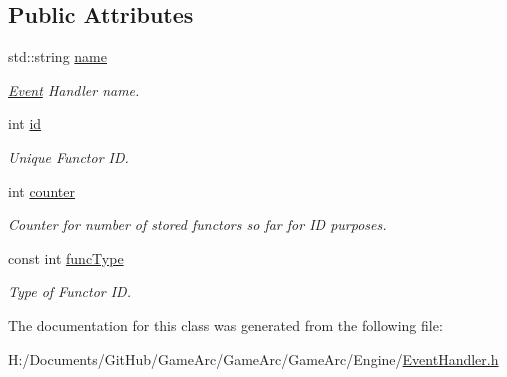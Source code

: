 \subsection*{Public Attributes}
\begin{DoxyCompactItemize}
\item 
\hypertarget{class_event_handler_aa5fd950e79ff5faedf4f728c321f6a8f}{std\+::string \hyperlink{class_event_handler_aa5fd950e79ff5faedf4f728c321f6a8f}{name}}\label{class_event_handler_aa5fd950e79ff5faedf4f728c321f6a8f}

\begin{DoxyCompactList}\small\item\em \hyperlink{class_event}{Event} Handler name. \end{DoxyCompactList}\item 
\hypertarget{class_event_handler_a42e721397724e29344fb56eeed8923b5}{int \hyperlink{class_event_handler_a42e721397724e29344fb56eeed8923b5}{id}}\label{class_event_handler_a42e721397724e29344fb56eeed8923b5}

\begin{DoxyCompactList}\small\item\em Unique Functor I\+D. \end{DoxyCompactList}\item 
\hypertarget{class_event_handler_a718ef39196fb47f8f0d66538b9fa31d7}{int \hyperlink{class_event_handler_a718ef39196fb47f8f0d66538b9fa31d7}{counter}}\label{class_event_handler_a718ef39196fb47f8f0d66538b9fa31d7}

\begin{DoxyCompactList}\small\item\em Counter for number of stored functors so far for I\+D purposes. \end{DoxyCompactList}\item 
\hypertarget{class_event_handler_af42c2a85560ab2f1f9c83f25c2c15fca}{const int \hyperlink{class_event_handler_af42c2a85560ab2f1f9c83f25c2c15fca}{func\+Type}}\label{class_event_handler_af42c2a85560ab2f1f9c83f25c2c15fca}

\begin{DoxyCompactList}\small\item\em Type of Functor I\+D. \end{DoxyCompactList}\end{DoxyCompactItemize}


The documentation for this class was generated from the following file\+:\begin{DoxyCompactItemize}
\item 
H\+:/\+Documents/\+Git\+Hub/\+Game\+Arc/\+Game\+Arc/\+Game\+Arc/\+Engine/\hyperlink{_event_handler_8h}{Event\+Handler.\+h}\end{DoxyCompactItemize}
